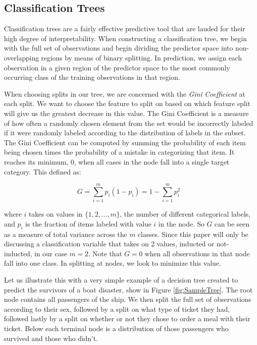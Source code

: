 \documentclass[preprint,12pt]{elsarticle}
\begin{document}
\subsection{Classification Trees}
Classification trees are a fairly effective predictive tool that are lauded for their high degree of interpretability. When constructing a classification tree, we begin with the full set of observations and begin dividing the predictor space into non-overlapping regions by means of binary splitting. In prediction, we assign each observation in a given region of the predictor space to the most commonly occurring class of the training observations in that region. 

When choosing splits in our tree, we are concerned with the \textit{Gini Coefficient} at each split. We want to choose the feature to split on based on which feature split will give us the greatest decrease in this value. The Gini Coefficient is a measure of how often a randomly chosen element from the set would be incorrectly labeled if it were randomly labeled according to the distribution of labels in the subset. The Gini Coefficient can be computed by summing the probability of each item being chosen times the probability of a mistake in categorizing that item. It reaches its minimum, $0$, when all cases in the node fall into a single target category. This defined as:

$$G = \sum\limits_{i=1}^m p_{i}(1-p_{i}) = 1 - \sum\limits_{i=1}^m p_{i}^{2}$$

\noindent where $i$ takes on values in $\{1,2,\ldots,m\}$, the number of different categorical labels, and $p_i$ is the fraction of items labeled with value $i$ in the node. So $G$ can be seen as a measure of total variance across the $m$ classes. Since this paper will only be discussing a classification variable that takes on 2 values, inducted or not-inducted, in our case $m=2$. Note that $G = 0$ when all observations in that node fall into one class. In splitting at nodes, we look to minimize this value.

Let us illustrate this with a very simple example of a decision tree created to predict the survivors of a boat disaster, show in Figure \ref{fig:SampleTree}. The root node contains all passengers of the ship. We then split the full set of observations according to their sex, followed by a split on what type of ticket they had, followed lastly by a split on whether or not they chose to order a meal with their ticket. Below each terminal node is a distribution of those passengers who survived and those who didn't. 
\end{document}
